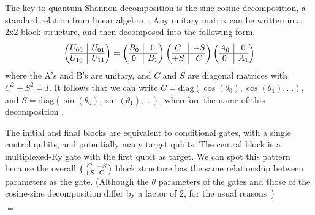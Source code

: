 The key to quantum Shannon decomposition is the sine-cosine decomposition, a standard relation from linear algebra~\cite{???}. Any unitary matrix can be written in a 2x2 block structure, and then decomposed into the following form, 
\[
\left(\begin{array}{@{}c|c@{}}
  U_{00}
  & U_{01} \\
\hline
  U_{10} &
  U_{11}   
\end{array}\right)
=
\left(\begin{array}{@{}c|c@{}}
B_0
  & 0 \\
\hline
  0 &
B_1
\end{array}\right)
\left(\begin{array}{@{}c|c@{}}
C
  & -S \\
\hline
  +S &
C
\end{array}\right)
\left(\begin{array}{@{}c|c@{}}
A_0
  & 0 \\
\hline
  0 &
A_1
\end{array}\right)
\]
where the A's and B's are unitary, and $C$ and $S$ are diagonal matrices with $C^2+S^2=I$. It follows that we can write $C=\text{diag}(\cos(\theta_0), \cos(\theta_1), \ldots)$, and $S=\text{diag}(\sin(\theta_0), \sin(\theta_1), \ldots)$, wherefore the name of this decomposition . 

The initial and final blocks are equivalent to conditional gates, with a single control qubits, and potentially many target qubits. The central block is a multiplexed-Ry gate with the first qubit as target. We can spot this pattern because the overall $\begin{psmallmatrix}C & -S\\ +S & C\end{psmallmatrix}$ block structure has the same relationship between parameters as the  gate. (Although the $\theta$ parameters of the  gates and those of the cosine-sine decomposition differ by a factor of 2, for the usual reasons~\cite{???})



\begin{center}
$ = $
\end{center}



